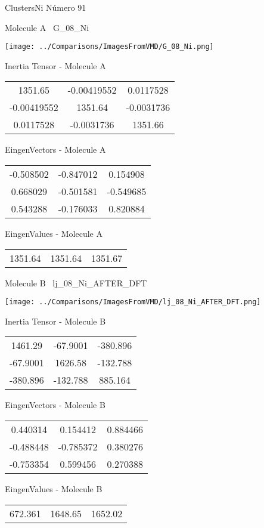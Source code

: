  \newpage

\vtab[-3cm]
\begin{center}
{\large ClustersNi \tab Número 91}
\end{center}
\begin{multicols}{2}
\begin{center}

Molecule A \
G\_08\_Ni

\texttt{[image: ../Comparisons/ImagesFromVMD/G\_08\_Ni.png]}

Inertia Tensor - Molecule A \\
\begin{tabular}{|c c c|}
1351.65	 & 	-0.00419552	 & 	0.0117528	 \\
-0.00419552	 & 	1351.64	 & 	-0.0031736	 \\
0.0117528	 & 	-0.0031736	 & 	1351.66
\end{tabular}

\vtab
 EingenVectors - Molecule A     \\
\begin{tabular}{|c c c|}
-0.508502	 & 	-0.847012	 & 	0.154908	 \\
0.668029	 & 	-0.501581	 & 	-0.549685	 \\
0.543288	 & 	-0.176033	 & 	0.820884
\end{tabular}

\vtab
 EingenValues - Molecule A     \\
\begin{tabular}{|c c c|}
1351.64	 & 	1351.64	 & 	1351.67	 \\
\end{tabular}
\columnbreak

Molecule B \
lj\_08\_Ni\_AFTER\_DFT

\texttt{[image: ../Comparisons/ImagesFromVMD/lj\_08\_Ni\_AFTER\_DFT.png]}

Inertia Tensor - Molecule B \\
\begin{tabular}{|c c c|}
1461.29	 & 	-67.9001	 & 	-380.896	 \\
-67.9001	 & 	1626.58	 & 	-132.788	 \\
-380.896	 & 	-132.788	 & 	885.164
\end{tabular}

\vtab
 EingenVectors - Molecule B     \\
\begin{tabular}{|c c c|}
0.440314	 & 	0.154412	 & 	0.884466	 \\
-0.488448	 & 	-0.785372	 & 	0.380276	 \\
-0.753354	 & 	0.599456	 & 	0.270388
\end{tabular}

\vtab
 EingenValues - Molecule B     \\
\begin{tabular}{|c c c|}
672.361	 & 	1648.65	 & 	1652.02	 \\
\end{tabular}

\end{center}
\end{multicols}

